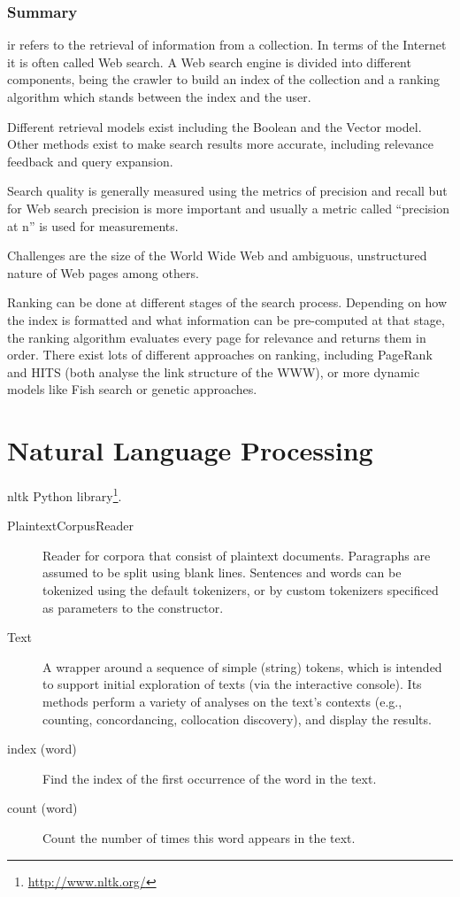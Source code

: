 \subsubsection*{Summary}

\gls{ir} refers to the retrieval of information from a collection. In terms of the Internet it is often called Web search. A Web search engine is divided into different components, being the crawler to build an index of the collection and a ranking algorithm which stands between the index and the user.

Different retrieval models exist including the Boolean and the Vector model. Other methods exist to make search results more accurate, including relevance feedback and query expansion.

Search quality is generally measured using the metrics of precision and recall but for Web search precision is more important and usually a metric called ``precision at n'' is used for measurements.

Challenges are the size of the World Wide Web and ambiguous, unstructured nature of Web pages among others.

Ranking can be done at different stages of the search process. Depending on how the index is formatted and what information can be pre-computed at that stage, the ranking algorithm evaluates every page for relevance and returns them in order. There exist lots of different approaches on ranking, including PageRank and HITS (both analyse the link structure of the WWW), or more dynamic models like Fish search or genetic approaches.


\section{Natural Language Processing}

\gls{nltk} Python library\footnote{\url{http://www.nltk.org/}}.

\begin{description}
  \item [PlaintextCorpusReader] Reader for corpora that consist of plaintext documents. Paragraphs are assumed to be split using blank lines. Sentences and words can be tokenized using the default tokenizers, or by custom tokenizers specificed as parameters to the constructor.
  \item [Text] A wrapper around a sequence of simple (string) tokens, which is intended to support initial exploration of texts (via the interactive console). Its methods perform a variety of analyses on the text’s contexts (e.g., counting, concordancing, collocation discovery), and display the results.
  \item [index (word)] Find the index of the first occurrence of the word in the text.
  \item [count (word)] Count the number of times this word appears in the text.
\end{description}


